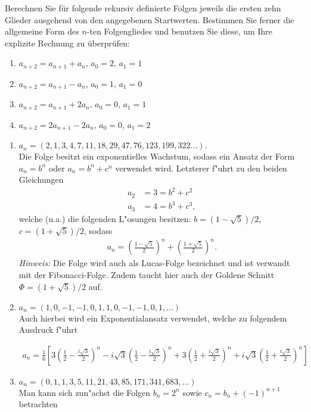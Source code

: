 \documentclass[12pt,answers]{exam}
\begin{document}
\begin{questions}
Berechnen Sie für folgende rekursiv definierte Folgen jeweils die ersten zehn Glieder ausgehend von den angegebenen Startwerten. Bestimmen Sie ferner die allgemeine Form des $n$-ten Folgengliedes und benutzen Sie diese, um Ihre explizite Rechnung zu überprüfen:
\begin{enumerate}
\item $a_{n+2}=a_{n+1}+a_{n}$, $a_0=2$, $a_1=1$
\item $a_{n+2}=a_{n+1}-a_{n}$, $a_0=1$, $a_1=0$
\item $a_{n+2}=a_{n+1}+2a_{n}$, $a_0=0$, $a_1=1$
\item $a_{n+2}=2a_{n+1}-2a_{n}$, $a_0=0$, $a_1=2$
\end{enumerate}
\begin{solution}
\begin{enumerate}
\item $a_n=(2,1,3,4,7,11,18,29,47,76,123,199,322\dots).$\\
Die Folge besitzt ein exponentielles Wachstum, sodass ein Ansatz der Form $a_n=b^n$ oder $a_n=b^n+c^n$ verwendet wird. Letzterer f"uhrt zu den beiden Gleichungen
\begin{align*}
a_2&=3=b^2+c^2\\
a_3&=4=b^3+c^3,
\end{align*}
welche (u.a.) die folgenden L"osungen besitzen: $b=(1-\sqrt{5})/2$, $c=(1+\sqrt{5})/2$, sodass
\begin{align*}
a_n=\left(\frac{1-\sqrt{5}}{2}\right)^n+\left(\frac{1+\sqrt{5}}{2}\right)^n.
\end{align*}
\textit{Hinweis:} Die Folge wird auch als Lucas-Folge bezeichnet und ist verwandt mit der Fibonacci-Folge. Zudem taucht hier auch der Goldene Schnitt $\Phi=(1+\sqrt{5})/2$ auf.
\item $a_n=(1,0,-1,-1,0,1,1,0,-1,-1,0,1,\dots)$\\
Auch hierbei wird ein Exponentialansatz verwendet, welche zu folgendem Ausdruck f"uhrt
\begin{small}
\begin{align*}
a_n=\frac{1}{6}
\left[
3\left(\frac{1}{2}-\frac{i\sqrt{3}}{2}\right)^n
-i\sqrt{3}\left(\frac{1}{2}-\frac{i\sqrt{3}}{2}\right)^n
+3\left(\frac{1}{2}+\frac{i\sqrt{3}}{2}\right)^n
+i\sqrt{3}\left(\frac{1}{2}+\frac{i\sqrt{3}}{2}\right)^n
\right]
\end{align*}
\end{small}
\item $a_n=(0,1,1,3,5,11,21,43,85,171,341,683,\dots)$\\
Man kann sich zun"achst die Folgen $b_n=2^n$ sowie $c_n=b_n+(-1)^{n+1}$ betrachten

\end{enumerate}
\end{solution}
\end{questions}
\end{document}
